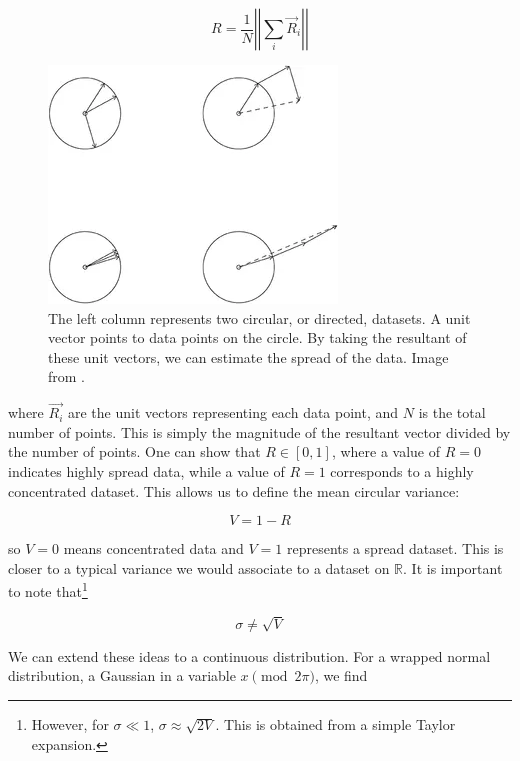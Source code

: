 \documentclass[../main.tex]{subfiles}
\begin{document}
\begin{equation}
    R = \frac{1}{N} \left|\left|\sum_i \Vec{R}_i \right|\right|
\end{equation}

\begin{figure}
    \centering
    \includegraphics[scale=0.6]{analysis/figs/resultant.png}
    \caption{The left column represents two circular, or directed, datasets. A unit vector points to data points on the circle. By taking the resultant of these unit vectors, we can estimate the spread of the data. Image from \cite{cremers_one_2018}.}
    \label{fig:resultant}
\end{figure}

where $\vec{R_i}$ are the unit vectors representing each data point, and $N$ is the total number of points. This is simply the magnitude of the resultant vector divided by the number of points. One can show that $R \in [0, 1]$, where a value of $R=0$ indicates highly spread data, while a value of $R=1$ corresponds to a highly concentrated dataset. This allows us to define the mean circular variance: 

\begin{equation}
    V = 1-R
\end{equation}

so $V=0$ means concentrated data and $V=1$ represents a spread dataset. This is closer to a typical variance we would associate to a dataset on $\mathbb{R}$. It is important to note that\footnote{However, for $\sigma \ll 1$, $\sigma \approx \sqrt{2V}$. This is obtained from a simple Taylor expansion.}

\begin{equation}
    \sigma \neq \sqrt{V}
\end{equation}

We can extend these ideas to a continuous distribution. For a wrapped normal distribution, a Gaussian in a variable $x \pmod{2\pi}$, we find 
\end{document}
